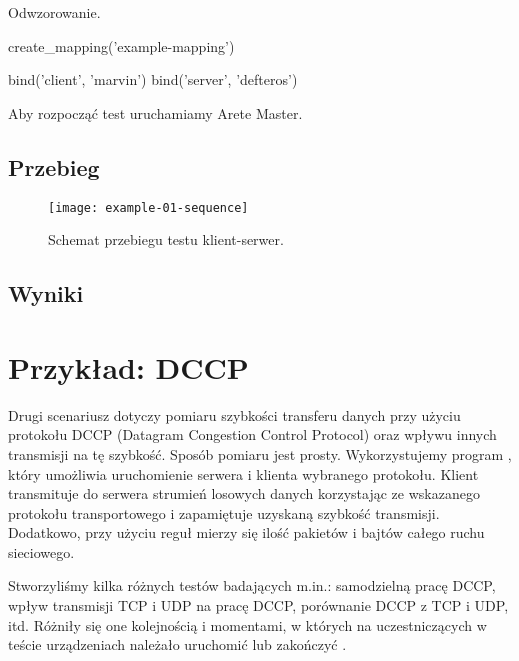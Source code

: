 \documentclass[00-praca-magisterska.tex]{subfiles}
\begin{document}
Odwzorowanie.

\begin{pythoncode}
  create_mapping('example-mapping')

  bind('client', 'marvin')
  bind('server', 'defteros')
\end{pythoncode}

Aby rozpocząć test uruchamiamy Arete Master.




\subsection{Przebieg}

\begin{figure}[htb]
\begin{center}
\leavevmode
\texttt{[image: example-01-sequence]}
\end{center}
\caption{Schemat przebiegu testu klient-serwer.}
\label{fig:example-01-sequence}
\end{figure}

\subsection{Wyniki}


\section{Przykład: DCCP}


Drugi scenariusz dotyczy pomiaru szybkości transferu danych przy użyciu
protokołu DCCP (Datagram Congestion Control Protocol) oraz wpływu innych
transmisji na tę szybkość. Sposób pomiaru jest prosty. Wykorzystujemy program
, który umożliwia uruchomienie serwera i klienta wybranego
protokołu. Klient transmituje do serwera strumień losowych danych korzystając
ze wskazanego protokołu transportowego i zapamiętuje uzyskaną szybkość
transmisji. Dodatkowo, przy użyciu reguł  mierzy się ilość
pakietów i bajtów całego ruchu sieciowego.

Stworzyliśmy kilka różnych testów badających m.in.: samodzielną pracę DCCP,
wpływ transmisji TCP i UDP na pracę DCCP, porównanie DCCP z TCP i UDP, itd.
Różniły się one kolejnością i momentami, w których na uczestniczących w teście
urządzeniach należało uruchomić lub zakończyć .
\end{document}

